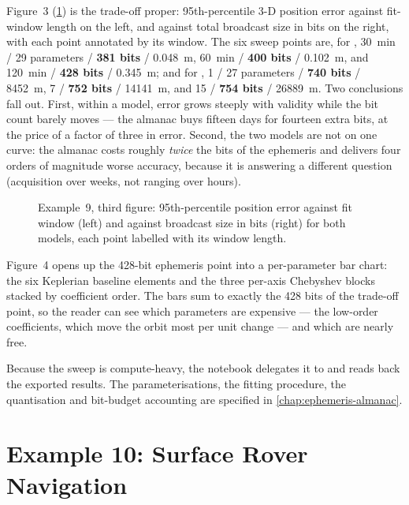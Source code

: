 Figure~3 (\cref{fig:tut-ex9-trade}) is the trade-off proper: 95th-percentile
3-D position error against fit-window length on the left, and against total
broadcast size in bits on the right, with each point annotated by its window.
The six sweep points are, for , \SI{30}{\minute} / 29
parameters / \textbf{381 bits} / \SI{0.048}{\meter}, \SI{60}{\minute} /
\textbf{400 bits} / \SI{0.102}{\meter}, and \SI{120}{\minute} / \textbf{428
bits} / \SI{0.345}{\meter}; and for , \SI{1}{\dayunit} / 27
parameters / \textbf{740 bits} / \SI{8452}{\meter}, \SI{7}{\dayunit} /
\textbf{752 bits} / \SI{14141}{\meter}, and \SI{15}{\dayunit} / \textbf{754
bits} / \SI{26889}{\meter}. Two conclusions fall out. First, within a model,
error grows steeply with validity while the bit count barely moves --- the
almanac buys fifteen days for fourteen extra bits, at the price of a factor of
three in error. Second, the two models are not on one curve: the almanac costs
roughly \emph{twice} the bits of the ephemeris and delivers four orders of
magnitude worse accuracy, because it is answering a different question
(acquisition over weeks, not ranging over hours).

\begin{figure}[htbp]
  \centering
  \caption{Example~9, third figure: 95th-percentile position error against fit
           window (left) and against broadcast size in bits (right) for both
           models, each point labelled with its window length.}
  \label{fig:tut-ex9-trade}
\end{figure}

Figure~4 opens up the 428-bit ephemeris point into a per-parameter bar chart:
the six Keplerian baseline elements and the three per-axis Chebyshev blocks
stacked by coefficient order. The bars sum to exactly the 428 bits of the
trade-off point, so the reader can see which parameters are expensive --- the
low-order coefficients, which move the orbit most per unit change --- and which
are nearly free.

Because the sweep is compute-heavy, the notebook delegates it to
 and reads back the exported results.
The parameterisations, the fitting procedure, the quantisation and bit-budget
accounting are specified in \cref{chap:ephemeris-almanac}.

\section{Example 10: Surface Rover Navigation}
\label{sec:tut-ex10}

